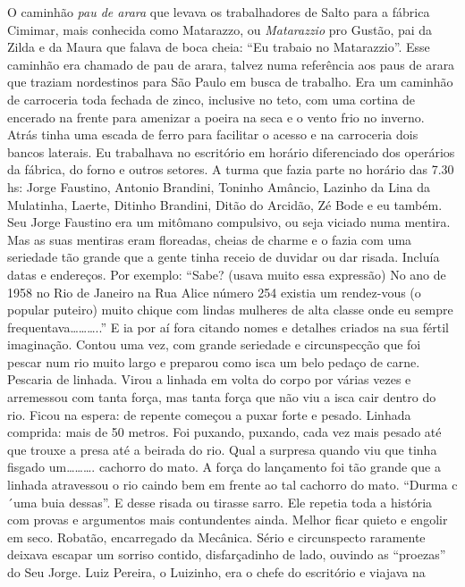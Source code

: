 \documentclass[12pt,brazil,]{book}
\begin{document}
O caminhão \emph{pau de arara} que levava os trabalhadores de Salto para
a fábrica Cimimar, mais conhecida como Matarazzo, ou \emph{Matarazzio}
pro Gustão, pai da Zilda e da Maura que falava de boca cheia: ``Eu
trabaio no Matarazzio''. Esse caminhão era chamado de pau de arara,
talvez numa referência aos paus de arara que traziam nordestinos para
São Paulo em busca de trabalho. Era um caminhão de carroceria toda
fechada de zinco, inclusive no teto, com uma cortina de encerado na
frente para amenizar a poeira na seca e o vento frio no inverno. Atrás
tinha uma escada de ferro para facilitar o acesso e na carroceria dois
bancos laterais. Eu trabalhava no escritório em horário diferenciado dos
operários da fábrica, do forno e outros setores. A turma que fazia parte
no horário das 7.30 hs: Jorge Faustino, Antonio Brandini, Toninho
Amâncio, Lazinho da Lina da Mulatinha, Laerte, Ditinho Brandini, Ditão
do Arcidão, Zé Bode e eu também. Seu Jorge Faustino era um mitômano
compulsivo, ou seja viciado numa mentira. Mas as suas mentiras eram
floreadas, cheias de charme e o fazia com uma seriedade tão grande que a
gente tinha receio de duvidar ou dar risada. Incluía datas e endereços.
Por exemplo: ``Sabe? (usava muito essa expressão) No ano de 1958 no Rio
de Janeiro na Rua Alice número 254 existia um rendez-vous (o popular
puteiro) muito chique com lindas mulheres de alta classe onde eu sempre
frequentava\ldots{}\ldots{}\ldots{}..'' E ia por aí fora citando nomes e
detalhes criados na sua fértil imaginação. Contou uma vez, com grande
seriedade e circunspecção que foi pescar num rio muito largo e preparou
como isca um belo pedaço de carne. Pescaria de linhada. Virou a linhada
em volta do corpo por várias vezes e arremessou com tanta força, mas
tanta força que não viu a isca cair dentro do rio. Ficou na espera: de
repente começou a puxar forte e pesado. Linhada comprida: mais de 50
metros. Foi puxando, puxando, cada vez mais pesado até que trouxe a
presa até a beirada do rio. Qual a surpresa quando viu que tinha fisgado
um\ldots{}\ldots{}\ldots{}. cachorro do mato. A força do lançamento foi
tão grande que a linhada atravessou o rio caindo bem em frente ao tal
cachorro do mato. ``Durma c´uma buia dessas''. E desse risada ou tirasse
sarro. Ele repetia toda a história com provas e argumentos mais
contundentes ainda. Melhor ficar quieto e engolir em seco. Robatão,
encarregado da Mecânica. Sério e circunspecto raramente deixava escapar
um sorriso contido, disfarçadinho de lado, ouvindo as ``proezas'' do Seu
Jorge. Luiz Pereira, o Luizinho, era o chefe do escritório e viajava na
\end{document}
